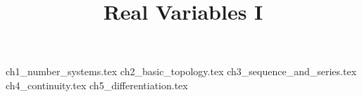 \documentclass[]{report}
\title{Real Variables I}
\begin{document}
\maketitle
{ch1_number_systems.tex}
{ch2_basic_topology.tex}
{ch3_sequence_and_series.tex}
{ch4_continuity.tex}
{ch5_differentiation.tex}
\end{document}
